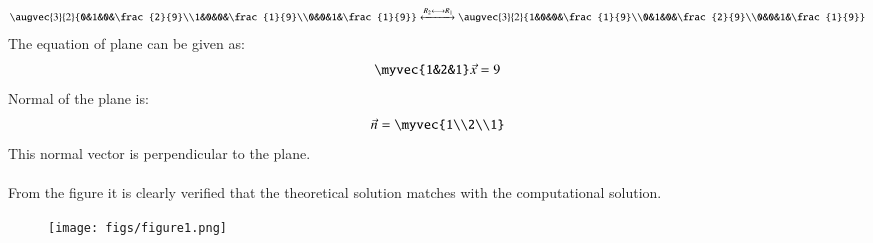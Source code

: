 \documentclass[journal]{IEEEtran}
\theoremstyle{remark}
\begin{document}
\begin{align}
 \augvec{3}{2}{0&1&0&\frac{2}{9}\\1&0&0&\frac{1}{9}\\0&0&1&\frac{1}{9}}\xleftrightarrow{R_2\longleftrightarrow R_1} \augvec{3}{2}{1&0&0&\frac{1}{9}\\0&1&0&\frac{2}{9}\\0&0&1&\frac{1}{9}}
\end{align}
The equation of plane can be given as:
\begin{align}
   \myvec{1&2&1}\Vec{x}=9
\end{align}
Normal of the plane is:
\begin{align}
   \Vec{n}=\myvec{1\\2\\1}  
\end{align}
This normal vector is perpendicular to the plane.\\\\
From the figure it is clearly verified that the theoretical solution matches with the computational solution.\\
\begin{figure}[h]
    \centering
    \texttt{[image: figs/figure1.png]}
    \label{figure_1}
\end{figure}
\end{document}
